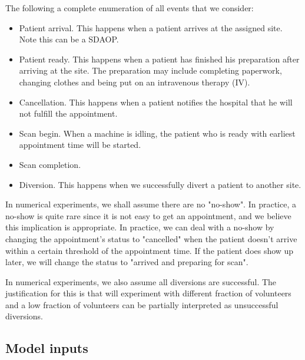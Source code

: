 The following a complete enumeration of all events that we consider:
\begin{itemize}
\item Patient arrival. This happens when a patient arrives at
      the assigned site. Note this can be a SDAOP.
\item Patient ready. This happens when a patient has finished his preparation
      after arriving at the site. The preparation may include completing
      paperwork, changing clothes and being put on an intravenous therapy (IV).
\item Cancellation. This happens when a patient notifies the hospital
      that he will not fulfill the appointment.
\item Scan begin. When a machine is idling, the patient who is ready
      with earliest appointment time will be started.
\item Scan completion.
\item Diversion. This happens when we successfully divert a patient
      to another site. 
\end{itemize}
In numerical experiments, we shall assume there are no "no-show".
In practice, a no-show is quite rare since it is not easy to get an appointment,
and we believe this implication is appropriate. In practice, we can deal
with a no-show by changing the appointment's status to "cancelled"
when the patient doesn't arrive within a certain threshold of
the appointment time. If the patient does show up later, we will
change the status to "arrived and preparing for scan".

In numerical experiments, we also assume all diversions are successful.
The justification for this is that will experiment with different fraction of volunteers
and a low fraction of volunteers can be partially interpreted as
unsuccessful diversions.

\subsection{Model inputs}

